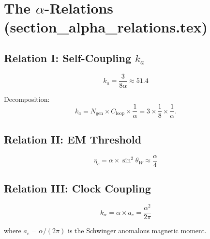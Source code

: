 \documentclass[11pt]{article}
\begin{document}
\section{The $\alpha$-Relations (section\_alpha\_relations.tex)}

\subsection{Relation I: Self-Coupling $k_a$}

\begin{equation}\tag{AR-1}
\boxed{k_a = \frac{3}{8\alpha} \approx 51.4}
\end{equation}

Decomposition:
\begin{equation}\tag{AR-2}
k_a = N_{\mathrm{gen}} \times C_{\mathrm{loop}} \times \frac{1}{\alpha} = 3 \times \frac{1}{8} \times \frac{1}{\alpha}.
\end{equation}

\subsection{Relation II: EM Threshold}

\begin{equation}\tag{AR-3}
\boxed{\eta_c = \alpha \times \sin^2\theta_W \approx \frac{\alpha}{4}}
\end{equation}

\subsection{Relation III: Clock Coupling}

\begin{equation}\tag{AR-4}
\boxed{k_\alpha = \alpha \times a_e = \frac{\alpha^2}{2\pi}}
\end{equation}

where $a_e = \alpha/(2\pi)$ is the Schwinger anomalous magnetic moment.
\end{document}
